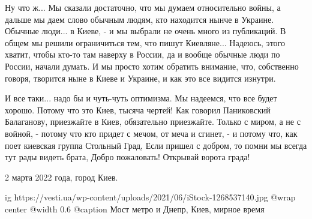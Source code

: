 Ну что ж... Мы сказали достаточно, что мы думаем относительно войны, а дальше
мы даем слово обычным людям, кто находится нынче в Украине. Обычные люди... в
Киеве, - и мы выбрали не очень много из публикаций. В общем мы решили
ограничиться тем, что пишут Киевляне... Надеюсь, этого хватит, чтобы кто-то там
наверху в России, да и вообще обычные люди по России, начали думать. И мы
просто хотим обратить внимание, что, собственно говоря, творится ныне в Киеве и
Украине, и как это все видится изнутри. 

И все таки... надо бы и чуть-чуть оптимизма. Мы надеемся, что все будет хорошо.
Потому что это Киев, тысяча чертей!  Как говорил Паниковский Балаганову,
приезжайте в Киев, обязательно приезжайте.  Только с миром, а не с войной, -
потому что кто придет с мечом, от меча и сгинет, - и потому что, как поет
киевская группа Стольный Град, Если пришел с добром, то помни мы всегда тут рады видеть
брата, Добро пожаловать! Открывай ворота града!

2 марта 2022 года, город Киев.

\ifcmt
  ig https://vesti.ua/wp-content/uploads/2021/06/iStock-1268537140.jpg
	@wrap center
	@width 0.6
	@caption Мост метро и Днепр, Киев, мирное время
\fi
